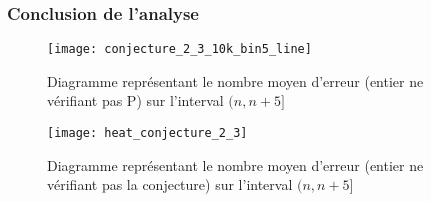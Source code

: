 \documentclass[../main.text]{report}
\begin{document}
\subsubsection{Conclusion de l'analyse}

\begin{figure}[H]
\centering
\texttt{[image: conjecture\_2\_3\_10k\_bin5\_line]}
\caption{Diagramme représentant le nombre moyen d'erreur (entier ne vérifiant pas P) sur l'interval $(n,n+5]$}
\label{fig:conjecture_2_3_10k_bin5_line}
\end{figure}

\begin{figure}[H]
\centering
\texttt{[image: heat\_conjecture\_2\_3]}
\caption{Diagramme représentant le nombre moyen d'erreur (entier ne vérifiant pas la conjecture) sur l'interval $(n,n+5]$}
\label{fig:heat_conjecture_2_3		}
\end{figure}
\end{document}
